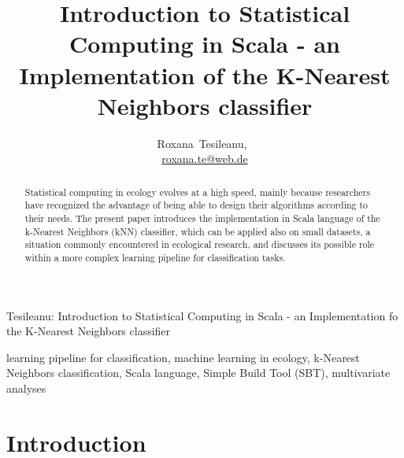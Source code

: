 \documentclass[journal]{IEEEtran}
\begin{document}
\title{Introduction to Statistical Computing in Scala - an Implementation of the K-Nearest Neighbors classifier}
\author{Roxana~Tesileanu,~ \\ \href{mailto: roxana.te@web.de}{roxana.te@web.de}}

{Tesileanu: Introduction to Statistical Computing in Scala - an Implementation fo the K-Nearest Neighbors classifier}

\maketitle

\begin{abstract}

Statistical computing in ecology evolves at a high speed, mainly because researchers have recognized the advantage of being able to design their algorithms according to their needs.
 The present paper introduces the implementation in Scala language of the k-Nearest Neighbors (kNN) classifier, which can be applied also on small datasets, a situation commonly encountered in ecological research, and discusses its possible role within a more complex learning pipeline for classification tasks. 

\end{abstract} 

\begin{IEEEkeywords}
learning pipeline for classification, machine learning in ecology, k-Nearest Neighbors classification, Scala language, Simple Build Tool (SBT), multivariate analyses 
\end{IEEEkeywords}

\section{Introduction}
\end{document}
